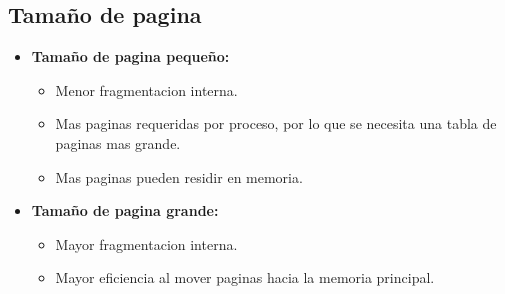 \documentclass[12pt]{article}
\begin{document}
\subsection{Tamaño de pagina}
\begin{itemize}
    \item \textbf{Tamaño de pagina pequeño:}
        \begin{itemize}
            \item Menor fragmentacion interna.
    \item Mas paginas requeridas por proceso, por lo que se necesita una tabla de paginas mas grande.
    \item Mas paginas pueden residir en memoria.
\end{itemize}
    \item \textbf{Tamaño de pagina grande:}
        \begin{itemize}
    \item Mayor fragmentacion interna.
    \item Mayor eficiencia al mover paginas hacia la memoria principal.
        \end{itemize}
\end{itemize}
\end{document}
